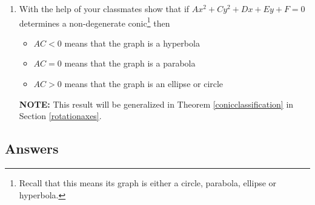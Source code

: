 \begin{enumerate}
\item \label{conicsclassificationnoxytermex} With the help of your classmates show that if $Ax^2 + Cy^2 + Dx + Ey + F = 0$ determines a non-degenerate conic\footnote{Recall that this means its graph is either a circle, parabola, ellipse or hyperbola.} then

\begin{itemize}

\item  $AC < 0$ means that the graph is a hyperbola

\item  $AC = 0$ means that the graph is a parabola

\item  $AC > 0$ means that the graph is an ellipse or circle

\end{itemize}

\textbf{NOTE:}  This result will be generalized in Theorem \ref{conicclassification} in Section \ref{rotationaxes}.

\end{enumerate}

\newpage

\subsection{Answers}

